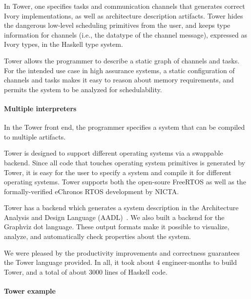 In Tower, one specifies tasks and communication channels that generates correct
Ivory implementations, as well as architecture description artifacts. Tower
hides the dangerous low-level scheduling primitives from the user, and keeps
type information for channels (i.e., the datatype of the channel message),
expressed as Ivory types, in the Haskell type system.

Tower allows the programmer to describe a static graph of channels and tasks.
For the intended use case in high assurance systems, a static configuration of
channels and tasks makes it easy to reason about memory requirements, and
permits the system to be analyzed for schedulability.

\paragraph{Multiple interpreters}

In the Tower front end, the programmer specifies a system that can be compiled
to multiple artifacts.

Tower is designed to support different operating systems via a swappable
backend. Since all code that touches operating system primitives is generated by
Tower, it is easy for the user to specify a system and compile it for
different operating systems. Tower supports both the open-soure
FreeRTOS\cite{freertos} as well as the formally-verified
eChronos RTOS\cite{echronos} development by NICTA.

Tower has a backend which generates a system description in the Architecture
Analysis and Design Language (AADL)~\cite{SAE:AADL}. We also built a backend for
the Graphviz dot language.  These output formats make it possible to visualize,
analyze, and automatically check properties about the system.

We were pleased by the productivity improvements and correctness guarantees the
Tower language provided. In all, it took about 4 engineer-months to build Tower,
and a total of about 3000 lines of Haskell code.


\paragraph{Tower example}
\label{sec:examples}


